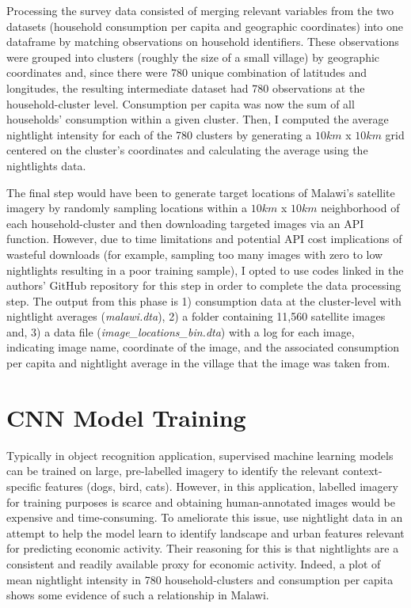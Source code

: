 \documentclass[11pt, a4paper, leqno]{article}
\begin{document}
\noindent Processing the survey data consisted of merging relevant variables from the two datasets (household consumption per capita and geographic coordinates) into one dataframe by matching observations on household identifiers. These observations were grouped into clusters (roughly the size of a small village) by geographic coordinates and, since there were 780 unique combination of latitudes and longitudes, the resulting intermediate dataset had 780 observations at the household-cluster level. Consumption per capita was now the sum of all households' consumption within a given cluster. Then, I computed the average nightlight intensity for each of the 780 clusters by generating a $10 km$ x $10 km$ grid centered on the cluster's coordinates and calculating the average using the nightlights data. 

\noindent The final step would have been to generate target locations of Malawi's satellite imagery by randomly sampling locations within a $10km$ x $10km$ neighborhood of each household-cluster and then downloading  targeted images via an API function. However, due to time limitations and potential API cost implications of wasteful downloads (for example, sampling too many images with zero to low nightlights resulting in a poor training sample), I opted to use codes linked in the authors' GitHub repository for this step in order to complete the data processing step. The output from this phase is 1) consumption data at the cluster-level with nightlight averages (\textit{malawi.dta}), 2) a folder containing 11,560 satellite images and, 3) a data file (\textit{image\_locations\_bin.dta}) with a log for each image, indicating image name, coordinate of the image, and the associated consumption per capita and  nightlight average in the village that the image was taken from.

\section{CNN Model Training}

\noindent Typically in object recognition application, supervised machine learning models can be trained on large, pre-labelled imagery to identify the relevant context-specific features (dogs, bird, cats). However, in this application, labelled imagery for training purposes is scarce and obtaining human-annotated images would be expensive and time-consuming. To ameliorate this issue, \citet{jean2016combining} use nightlight data in an attempt to help the model learn to identify landscape and urban features relevant for predicting economic activity. Their reasoning for this is that nightlights are a consistent and readily available proxy for economic activity. Indeed, a plot of mean nightlight intensity in 780 household-clusters and consumption per capita shows some evidence of such a relationship in Malawi.
\end{document}

